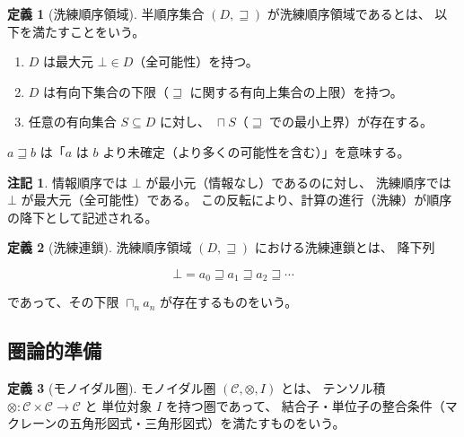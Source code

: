 \documentclass[11pt,a4paper]{article}
\theoremstyle{definition}
\newtheorem{definition}{定義}[section]
\newtheorem{remark}{注記}[section]
\DeclareMathOperator*{\bigsqcap}{\sqcap}
\begin{document}
\begin{definition}[洗練順序領域]
半順序集合 $(D, \sqsupseteq)$ が洗練順序領域であるとは、
以下を満たすことをいう。

\begin{enumerate}
\item $D$ は最大元 $\bot \in D$（全可能性）を持つ。
\item $D$ は有向下集合の下限（$\sqsupseteq$ に関する有向上集合の上限）を持つ。
\item 任意の有向集合 $S \subseteq D$ に対し、
  $\bigsqcap S$（$\sqsupseteq$ での最小上界）が存在する。
\end{enumerate}

$a \sqsupseteq b$ は「$a$ は $b$ より未確定（より多くの可能性を含む）」を意味する。
\end{definition}

\begin{remark}
情報順序では $\bot$ が最小元（情報なし）であるのに対し、
洗練順序では $\bot$ が最大元（全可能性）である。
この反転により、計算の進行（洗練）が順序の降下として記述される。
\end{remark}

\begin{definition}[洗練連鎖]
洗練順序領域 $(D, \sqsupseteq)$ における洗練連鎖とは、
降下列

\begin{equation}
\bot = a_0 \sqsupseteq a_1 \sqsupseteq a_2 \sqsupseteq \cdots
\end{equation}

であって、その下限 $\bigsqcap_{n} a_n$ が存在するものをいう。
\end{definition}

\subsection{圏論的準備}

\begin{definition}[モノイダル圏]
モノイダル圏 $(\mathcal{C}, \otimes, I)$ とは、
テンソル積 $\otimes: \mathcal{C} \times \mathcal{C} \to \mathcal{C}$ と
単位対象 $I$ を持つ圏であって、
結合子・単位子の整合条件（マクレーンの五角形図式・三角形図式）を満たすものをいう。
\end{definition}
\end{document}
